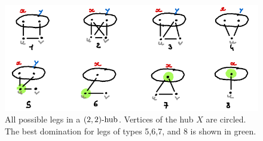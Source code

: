 \begin{figure}
    \centering
    \includegraphics[width=.8\textwidth]{figures/domset-22-legs.png}
    \caption{All possible legs in a $\sdhub[2,2]$. Vertices of the hub $X$ are circled. The best domination for legs of types 5,6,7, and 8 is shown in green.}
    \label{fig:domset-22-legs}
\end{figure}